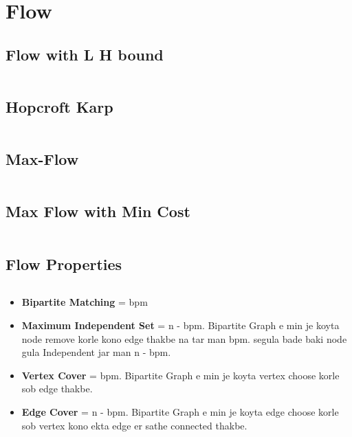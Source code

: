 \section{Flow}
\subsection{\small Flow with L H bound  \scriptsize}
\inputminted[breaklines, breakanywhere]{c++}{code/10-Flow/02-Flow with L H bound.cpp}

\subsection{\small Hopcroft Karp  \scriptsize}
\inputminted[breaklines, breakanywhere]{c++}{code/10-Flow/03-Hopcroft Karp.cpp}

\subsection{\small Max-Flow  \scriptsize}
\inputminted[breaklines, breakanywhere]{c++}{code/10-Flow/05-Max-Flow.cpp}

\subsection{\small Max Flow with Min Cost  \scriptsize}
\inputminted[breaklines, breakanywhere]{c++}{code/10-Flow/06-Max Flow with Min Cost.cpp}

\subsection{\small Flow Properties  \scriptsize}
\inputminted[breaklines, breakanywhere]{c++}{code/10-Flow/17-Flow Properties.cpp}

\vspace{-5.5mm}
{\footnotesize
\begin{itemize}
\item \textbf{Bipartite Matching} = bpm
\item \textbf{Maximum Independent Set} = n - bpm. Bipartite Graph e min je koyta node remove korle kono edge thakbe na tar man bpm. segula bade baki node gula Independent jar man n - bpm.
\item \textbf{Vertex Cover} = bpm. Bipartite Graph e min je koyta vertex choose korle sob edge thakbe.
\item \textbf{Edge Cover} = n - bpm. Bipartite Graph e min je koyta edge choose korle sob vertex kono ekta edge er sathe connected thakbe.

\end{itemize}
}


